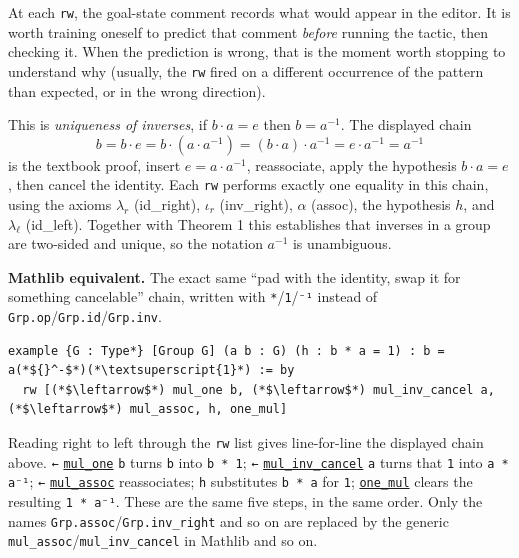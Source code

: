 At each \texttt{rw}, the goal-state comment records what would appear in the editor. It is worth training oneself to predict that comment \emph{before} running the tactic, then checking it. When the prediction is wrong, that is the moment worth stopping to understand why (usually, the \texttt{rw} fired on a different occurrence of the pattern than expected, or in the wrong direction).

\begin{mathreading}

This is \emph{uniqueness of inverses}, if \(b\cdot a =
e\) then \(b = a^{-1}\). The displayed chain \[
b = b\cdot e = b\cdot(a\cdot a^{-1}) = (b\cdot a)\cdot a^{-1} = e\cdot a^{-1}
= a^{-1}
\] is the textbook proof, insert \(e = a\cdot a^{-1}\), reassociate, apply the hypothesis \(b\cdot a = e\), then cancel the identity. Each \texttt{rw} performs exactly one equality in this chain, using the axioms \(\lambda_r\) (id\_right), \(\iota_r\) (inv\_right), \(\alpha\) (assoc), the hypothesis \(h\), and \(\lambda_\ell\) (id\_left). Together with Theorem 1 this establishes that inverses in a group are two-sided and unique, so the notation \(a^{-1}\) is unambiguous.

\end{mathreading}

\textbf{Mathlib equivalent.} The exact same ``pad with the identity, swap it for something cancelable'' chain, written with \texttt{*}/\texttt{1}/\texttt{⁻¹} instead of \texttt{Grp.op}/\texttt{Grp.id}/\texttt{Grp.inv}.

\begin{lstlisting}
example {G : Type*} [Group G] (a b : G) (h : b * a = 1) : b = a(*${}^-$*)(*\textsuperscript{1}*) := by
  rw [(*$\leftarrow$*) mul_one b, (*$\leftarrow$*) mul_inv_cancel a, (*$\leftarrow$*) mul_assoc, h, one_mul]
\end{lstlisting}

Reading right to left through the \texttt{rw} list gives line-for-line the displayed chain above. \texttt{←} \href{https://loogle.lean-lang.org/?q=mul_one}{\texttt{mul\_\allowbreak{}one}} \texttt{b} turns \texttt{b} into \texttt{b * 1}; \texttt{←} \href{https://loogle.lean-lang.org/?q=mul_inv_cancel}{\texttt{mul\_\allowbreak{}inv\_\allowbreak{}cancel}} \texttt{a} turns that \texttt{1} into \texttt{a * a⁻¹}; \texttt{←} \href{https://loogle.lean-lang.org/?q=mul_assoc}{\texttt{mul\_\allowbreak{}assoc}} reassociates; \texttt{h} substitutes \texttt{b * a} for \texttt{1}; \href{https://loogle.lean-lang.org/?q=one_mul}{\texttt{one\_\allowbreak{}mul}} clears the resulting \texttt{1 * a⁻¹}. These are the same five steps, in the same order. Only the names \texttt{Grp.assoc}/\texttt{Grp.inv\_\allowbreak{}right} and so on are replaced by the generic \texttt{mul\_\allowbreak{}assoc}/\texttt{mul\_\allowbreak{}inv\_\allowbreak{}cancel} in Mathlib and so on.
